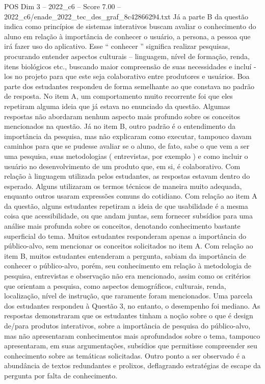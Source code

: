 \begin{textsample}{POS Dim 3 – 2022\_c6 – Score 7.00 – 2022\_c6/enade\_2022\_tec\_des\_graf\_8c42866294.txt}
Já a parte B da questão indica como princípios de sistemas interativos buscam avaliar o conhecimento do aluno em relação à importância de conhecer o usuário, a persona, a pessoa que irá fazer uso do aplicativo.
Esse “ conhecer ” significa realizar pesquisas, procurando entender aspectos culturais – linguagem, nível de formação, renda, itens biológicos etc., buscando maior compreensão de suas necessidades e incluí -los no projeto para que este seja colaborativo entre produtores e usuários.
Boa parte dos estudantes respondeu de forma semelhante ao que constava no padrão de resposta.
No item A, um comportamento muito recorrente foi que eles repetiram alguma ideia que já estava no enunciado da questão.
Algumas respostas não abordaram nenhum aspecto mais profundo sobre os conceitos mencionados na questão.
Já no item B, outro padrão é o entendimento da importância da pesquisa, mas não explicaram como executar, tampouco davam caminhos para que se pudesse avaliar se o aluno, de fato, sabe o que vem a ser uma pesquisa, suas metodologias ( entrevistas, por exemplo ) e como incluir o usuário no desenvolvimento de um produto que, em si, é colaborativo.
Com relação à linguagem utilizada pelos estudantes, as respostas estavam dentro do esperado.
Alguns utilizaram os termos técnicos de maneira muito adequada, enquanto outros usaram expressões comuns do cotidiano.
Com relação ao item A da questão, alguns estudantes repetiram a ideia de que usabilidade é a mesma coisa que acessibilidade, ou que andam juntas, sem fornecer subsídios para uma análise mais profunda sobre os conceitos, denotando conhecimento bastante superficial do tema.
Muitos estudantes responderam apenas a importância do público-alvo, sem mencionar os conceitos solicitados no item A.
Com relação ao item B, muitos estudantes entenderam a pergunta, sabiam da importância de conhecer o público-alvo, porém, seu conhecimento em relação à metodologia de pesquisa, entrevistas e observação não era mencionado, assim como os critérios que orientam a pesquisa, como aspectos demográficos, culturais, renda, localização, nível de instrução, que raramente foram mencionados.
Uma parcela dos estudantes respondeu à Questão 3, no entanto, o desempenho foi mediano.
As respostas demonstraram que os estudantes tinham a noção sobre o que é design de/para produtos interativos, sobre a importância de pesquisa do público-alvo, mas não apresentaram conhecimentos mais aprofundados sobre o tema, tampouco apresentaram, em suas argumentações, subsídios que permitisse compreender seu conhecimento sobre as temáticas solicitadas.
Outro ponto a ser observado é a abundância de textos redundantes e prolixos, deflagrando estratégias de escape da pergunta por falta de conhecimento.

\end{textsample}
